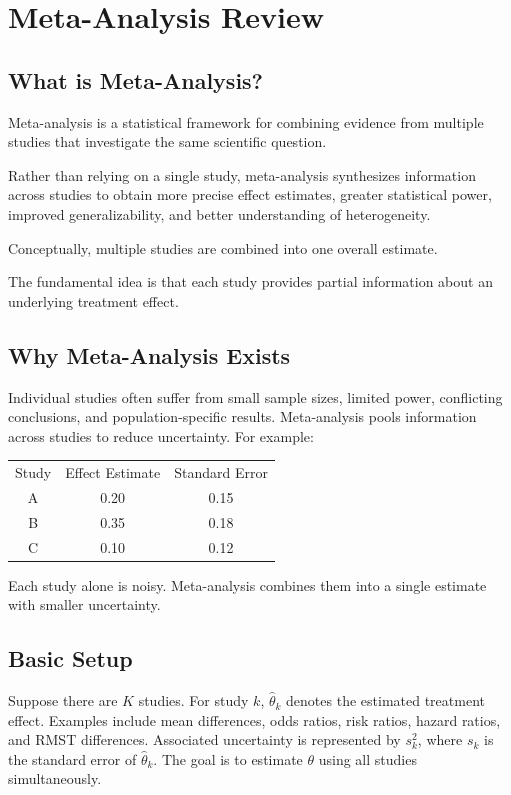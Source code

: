 \documentclass[11pt]{article}
\begin{document}
\section{Meta-Analysis Review}

\subsection*{What is Meta-Analysis?}

Meta-analysis is a statistical framework for combining evidence from multiple studies that investigate the same scientific question.

Rather than relying on a single study, meta-analysis synthesizes information across studies to obtain more precise effect estimates, greater statistical power, improved generalizability, and better understanding of heterogeneity.

Conceptually, multiple studies are combined into one overall estimate.

The fundamental idea is that each study provides partial information about an underlying treatment effect.

\subsection*{Why Meta-Analysis Exists}

Individual studies often suffer from small sample sizes, limited power, conflicting conclusions, and population-specific results.
Meta-analysis pools information across studies to reduce uncertainty.
For example:

\begin{center}
\begin{tabular}{ccc}
Study & Effect Estimate & Standard Error \\
A & 0.20 & 0.15 \\
B & 0.35 & 0.18 \\
C & 0.10 & 0.12
\end{tabular}
\end{center}

Each study alone is noisy. Meta-analysis combines them into a single estimate with smaller uncertainty.

\subsection*{Basic Setup}

Suppose there are $K$ studies. For study $k$, $\hat{\theta}_k$ denotes the estimated treatment effect. Examples include mean differences, odds ratios, risk ratios, hazard ratios, and RMST differences.
Associated uncertainty is represented by $s_k^2$, where $s_k$ is the standard error of $\hat{\theta}_k$.
The goal is to estimate $\theta$ using all studies simultaneously.
\end{document}

